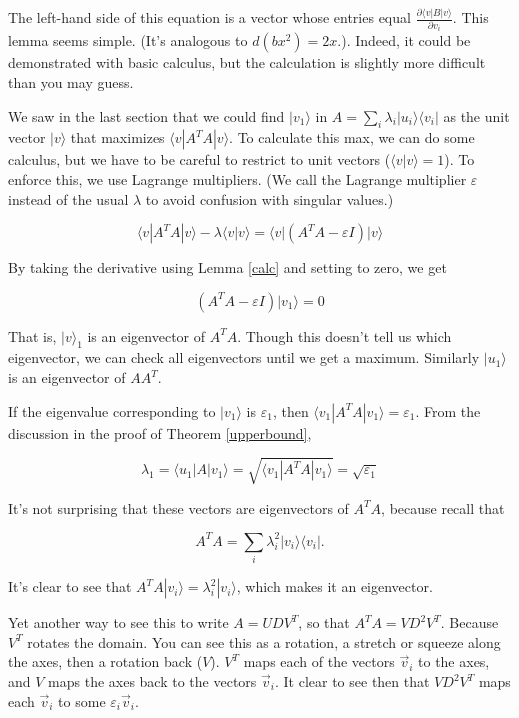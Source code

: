 \documentclass{amsbook}
\begin{document}
The left-hand side of this equation is a vector whose entries equal $\frac{\partial\langle v|B|v\rangle}{\partial v_i}$.  This lemma seems simple.  (It's analogous to $d(bx^2)=2x$.). Indeed, it could be demonstrated with basic calculus, but the calculation is slightly more difficult than you may guess.

We saw in the last section that we could find $|v_1\rangle$ in $A=\sum_i\lambda_i|u_i\rangle\langle v_i|$ as the unit vector $|v\rangle$ that maximizes $\langle v|A^TA|v\rangle$.  To calculate this max, we can do some calculus, but we have to be careful to restrict to unit vectors ($\langle v|v\rangle=1$).  To enforce this, we use Lagrange multipliers.  (We call the Lagrange multiplier $\varepsilon$ instead of the usual $\lambda$ to avoid confusion with singular values.)

$$
\langle v|A^TA|v\rangle-\lambda\langle v|v\rangle=\langle v|\left(A^TA-\varepsilon I\right)|v\rangle
$$

By taking the derivative using Lemma \ref{calc} and setting to zero, we get

$$
\left(A^TA-\varepsilon I\right)|v_1\rangle=0
$$

That is, $|v\rangle_1$ is an eigenvector of $A^TA$.  Though this doesn't tell us which eigenvector, we can check all eigenvectors until we get a maximum.  Similarly $|u_1\rangle$ is an eigenvector of $AA^T$.

If the eigenvalue corresponding to $|v_1\rangle$ is $\varepsilon_1$, then $\langle v_1|A^TA|v_1\rangle=\varepsilon_1$.  From the discussion in the proof of Theorem \ref{upperbound},

$$
\lambda_1=\langle u_1|A|v_1\rangle=\sqrt{\langle v_1|A^TA|v_1\rangle}=\sqrt{\varepsilon_1}
$$

It's not surprising that these vectors are eigenvectors of $A^TA$, because recall that 

$$
A^TA=\sum_i\lambda_i^2|v_i\rangle\langle v_i|.
$$

It's clear to see that $A^TA|v_i\rangle=\lambda_i^2|v_i\rangle$, which makes it an eigenvector.

Yet another way to see this to write $A=UDV^T$, so that $A^TA=VD^2V^T$.  Because $V^T$ rotates the domain.  You can see this as a rotation, a stretch or squeeze along the axes, then a rotation back ($V$).  $V^T$ maps each of the vectors $\vec v_i$ to the axes, and $V$ maps the axes back to the vectors $\vec v_i$.  It clear to see then that $VD^2V^T$ maps each $\vec v_i$ to some $\varepsilon_i\vec v_i$.
\end{document}
